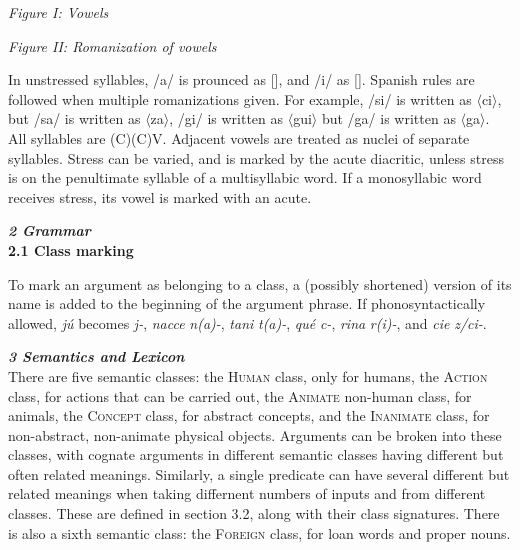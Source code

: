\documentclass{article}[10pt]
\begin{document}
\begin{multicols}{2}
{\begin{center}
\emph{Figure I: Vowels}\\
 \Large
\begin{vowel}
\end{vowel} \end{center}}

{\begin{center}
\emph{Figure II: Romanization of vowels}\\
 \Large
\begin{vowel}
\end{vowel} \end{center}}
\end{multicols}

In unstressed syllables, /a/ is prounced as [], and /i/ as []. Spanish rules are followed when multiple romanizations given. For example, /si/ is written as $\langle$ci$\rangle$, but /sa/ is written as $\langle$za$\rangle$, /gi/ is written as $\langle$gui$\rangle$ but /ga/ is written as $\langle$ga$\rangle$. All syllables are (C)(C)V. Adjacent vowels are treated as nuclei of separate syllables. Stress can be varied, and is marked by the acute diacritic, unless stress is on the penultimate syllable of a multisyllabic word. If a monosyllabic word receives stress, its vowel is marked with an acute.

\clearpage
{\bf \emph{2 Grammar}}\\

{\bf 2.1 Class marking}

    To mark an argument as belonging to a class, a (possibly shortened) version of its name is added to the beginning of the argument phrase. If phonosyntactically allowed, \emph{j\'{u}} becomes \emph{j-}, \emph{nacce} \emph{n(a)-}, \emph{tani} \emph{t(a)-}, \emph{qu\'{e}} \emph{c-}, \emph{rina} \emph{r(i)-}, and \emph{cie} \emph{z/ci-}.  

\clearpage
{\bf \emph{3 Semantics and Lexicon}}\\

There are five semantic classes: the \textsc{Human} class, only for humans, the \textsc{Action} class, for actions that can be carried out, the \textsc{Animate} non-human class, for animals, the \textsc{Concept} class, for abstract concepts, and the \textsc{Inanimate} class, for non-abstract, non-animate physical objects. Arguments can be broken into these classes, with cognate arguments in different semantic classes having different but often related meanings. Similarly, a single predicate can have several different but related meanings when taking differnent numbers of inputs and from different classes. These are defined in section 3.2, along with their class signatures. There is also a sixth semantic class: the \textsc{Foreign} class, for loan words and proper nouns.\\
\end{document}
